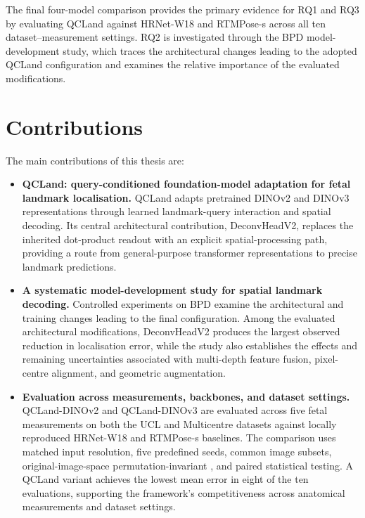 The final four-model comparison provides the primary evidence for
RQ1 and RQ3 by evaluating QCLand against HRNet-W18 and RTMPose-s
across all ten dataset--measurement settings. RQ2 is investigated
through the BPD model-development study, which traces the
architectural changes leading to the adopted QCLand configuration
and examines the relative importance of the evaluated modifications.



\section{Contributions}
\label{sec:intro-contributions}

The main contributions of this thesis are:

\begin{itemize}

\item \textbf{QCLand: query-conditioned foundation-model adaptation
for fetal landmark localisation.}
QCLand adapts pretrained DINOv2 and DINOv3 representations through
learned landmark-query interaction and spatial decoding. Its central
architectural contribution, DeconvHeadV2, replaces the inherited
dot-product readout with an explicit spatial-processing path,
providing a route from general-purpose transformer representations
to precise landmark predictions.

\item \textbf{A systematic model-development study for spatial
landmark decoding.}
Controlled experiments on BPD examine the architectural and training
changes leading to the final configuration. Among the evaluated
architectural modifications, DeconvHeadV2 produces the largest
observed reduction in localisation error, while the study also
establishes the effects and remaining uncertainties associated with
multi-depth feature fusion, pixel-centre alignment, and geometric
augmentation.

\item \textbf{Evaluation across measurements, backbones, and dataset
settings.}
QCLand-DINOv2 and QCLand-DINOv3 are evaluated across five fetal
measurements on both the UCL and Multicentre datasets against locally
reproduced HRNet-W18 and RTMPose-s baselines. The comparison uses
matched input resolution, five predefined seeds, common image
subsets, original-image-space permutation-invariant \NME{}, and
paired statistical testing. A QCLand variant achieves the lowest mean
error in eight of the ten evaluations, supporting the framework's
competitiveness across anatomical measurements and dataset settings.

\end{itemize}


